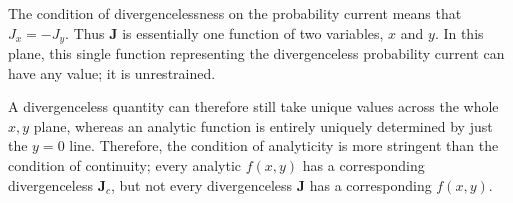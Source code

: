 The condition of divergencelessness on the probability current means that $J_x =
- J_y$. Thus $\mathbf{J}$ is essentially one function of two variables, $x$ and
$y$. In this plane, this single function representing the divergenceless
probability current can have any value; it is unrestrained.

A divergenceless quantity can therefore still take unique values across the
whole $x,y$ plane, whereas an analytic function is entirely uniquely determined
by just the $y = 0$ line. Therefore, the condition of analyticity is more
stringent than the condition of continuity; every analytic $f(x,y)$ has a
corresponding divergenceless $\mathbf{J}_c$, but not every divergenceless
$\mathbf{J}$ has a corresponding $f(x,y)$.
